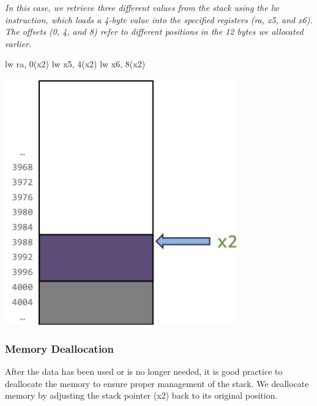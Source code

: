 \begin{minipage}[htp]{0.4\textwidth}
\textit{In this case, we retrieve three different values from the stack using the lw instruction, which loads a 4-byte value into the specified registers (ra, x5, and x6). The offsets (0, 4, and 8) refer to different positions in the 12 bytes we allocated earlier.}
\begin{assembly}
lw ra, 0(x2)
lw x5, 4(x2)
lw x6, 8(x2)
\end{assembly}
\end{minipage}
\hfill
\vline
\hfill
\begin{minipage}[htp]{0.4\textwidth}
\begin{center}
\includegraphics[width=0.75\textwidth]{chapters/chapter1b/images/stack3.png}
\end{center}
\end{minipage}
\newpage

\subsubsection{Memory Deallocation}
After the data has been used or is no longer needed, it is good practice to deallocate the memory to ensure proper management of the stack. We deallocate memory by adjusting the stack pointer (x2) back to its original position.

